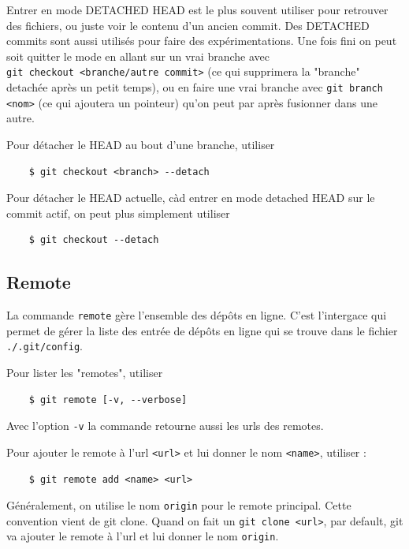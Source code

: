 \documentclass[a4paper, 12pt]{article}
\begin{document}
    Entrer en mode DETACHED HEAD est le plus souvent utiliser pour retrouver
    des fichiers, ou juste voir le contenu d'un ancien commit. Des DETACHED
    commits sont aussi utilisés pour faire des expérimentations. Une fois fini
    on peut soit quitter le mode en allant sur un vrai branche
    avec \\
    \lstinline{git checkout <branche/autre commit>} (ce qui supprimera la
    "branche" detachée après un petit temps), ou en faire une vrai branche avec
    \lstinline{git branch <nom>} (ce qui ajoutera un pointeur) qu'on peut par
    après fusionner dans une autre.

    Pour détacher le HEAD au bout d'une branche, utiliser
    \begin{lstlisting}
    $ git checkout <branch> --detach
    \end{lstlisting}

    Pour détacher le HEAD actuelle, càd entrer en mode detached HEAD sur le
    commit actif, on peut plus simplement utiliser
    \begin{lstlisting}
    $ git checkout --detach
    \end{lstlisting}

    \subsection{Remote}
    
    La commande \lstinline{remote} gère l'ensemble des dépôts en ligne.  C'est
    l'intergace qui permet de gérer la liste des entrée de dépôts en ligne qui
    se trouve dans le fichier \lstinline{./.git/config}.

    Pour lister les "remotes", utiliser 
    \begin{lstlisting}
    $ git remote [-v, --verbose]
    \end{lstlisting}
    Avec l'option \lstinline{-v} la commande retourne aussi les urls des
    remotes. 

    Pour ajouter le remote à l'url \lstinline{<url>} et lui donner le nom 
    \lstinline{<name>}, utiliser :
    \begin{lstlisting}
    $ git remote add <name> <url>
    \end{lstlisting}
    Généralement, on utilise le nom \lstinline{origin} pour le remote principal.
    Cette convention vient de git clone. Quand on fait un 
    \lstinline{git clone <url>}, par default, git va ajouter le remote à l'url
    et lui donner le nom \lstinline{origin}. 
\end{document}
